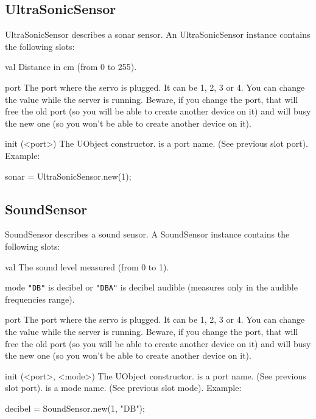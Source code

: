 \subsection{UltraSonicSensor}
UltraSonicSensor describes a sonar sensor. An UltraSonicSensor instance
contains the following slots:

\begin{urbiscriptapi}
\item[val] Distance in cm (from 0 to 255).

\item[port] The port where the servo is plugged. It can be 1, 2, 3 or 4. You
  can change the value while the server is running. Beware, if you change
  the port, that will free the old port (so you will be able to create
  another device on it) and will busy the new one (so you won't be able to
  create another device on it).

\item[init](<port>) The UObject constructor.  is a port name. (See
  previous slot port). Example:
\begin{urbiunchecked}
sonar = UltraSonicSensor.new(1);
\end{urbiunchecked}

\end{urbiscriptapi}

\subsection{SoundSensor}

SoundSensor describes a sound sensor. A SoundSensor instance contains the
following slots:

\begin{urbiscriptapi}

\item[val] The sound level measured (from 0 to 1).

\item[mode] \lstinline{"DB"} is decibel or \lstinline{"DBA"} is decibel
  audible (measures only in the audible frequencies range).

\item[port] The port where the servo is plugged. It can be 1, 2, 3 or 4. You
  can change the value while the server is running. Beware, if you change
  the port, that will free the old port (so you will be able to create
  another device on it) and will busy the new one (so you won't be able to
  create another device on it).


\item[init](<port>, <mode>) The UObject constructor.  is a port
  name. (See previous slot port).  is a mode name. (See
  previous slot mode). Example:
\begin{urbiunchecked}
decibel = SoundSensor.new(1, "DB");
\end{urbiunchecked}

\end{urbiscriptapi}

